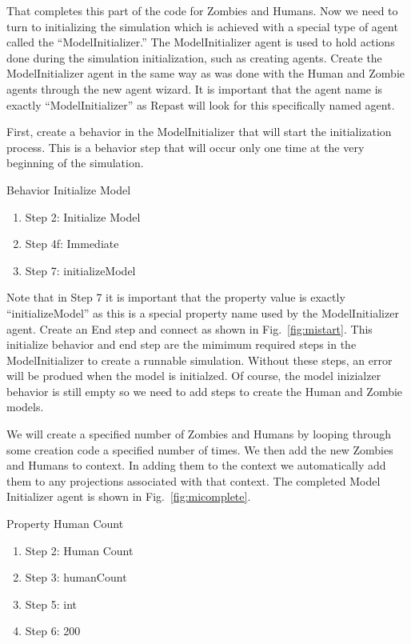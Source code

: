 \documentclass[11pt]{amsart}
\begin{document}
That completes this part of the code for Zombies and Humans. Now we need to turn to initializing the simulation which is achieved with a special type of agent called the ``ModelInitializer.''  The ModelInitializer agent is used to hold actions done during the simulation initialization, such as creating agents.  Create the ModelInitializer agent in the same way as was done with the Human and Zombie agents through the new agent wizard.  It is important that the agent name is exactly ``ModelInitializer'' as Repast will look for this specifically named agent.  

First, create a behavior in the ModelInitializer that will start the initialization process.  This is a behavior step that will occur only one time at the very beginning of the simulation.

Behavior Initialize Model
\begin{enumerate}
 \item Step 2: Initialize Model
 \item Step 4f: Immediate 
 \item Step 7: initializeModel
\end{enumerate}

Note that in Step 7 it is important that the property value is exactly ``initializeModel'' as this is a special property name used by the ModelInitializer agent.  Create an End step and connect as shown in Fig.~\ref{fig:mistart}. This initialize behavior and end step are the mimimum required steps in the ModelInitializer to create a runnable simulation.  Without these steps, an error will be produed when the model is initialzed.  Of course, the model inizialzer behavior is still empty so we need to add steps to create the Human and Zombie models.

We will create a specified number of Zombies and Humans by looping through some creation code a specified number of times. We then add the new Zombies and Humans to context. In adding them to the context we automatically add them to any projections associated with that context.  The completed Model Initializer agent is shown in Fig.~\ref{fig:micomplete}.

Property Human Count
\begin{enumerate}
 \item Step 2: Human Count
 \item Step 3: humanCount 
 \item Step 5: int
 \item Step 6: 200
\end{enumerate}
 
\end{document}
